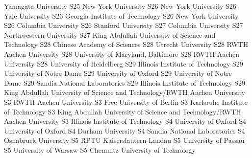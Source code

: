 \begin{multicols}{2}
{Yamagata University}
{S25}
{}
{New York University}
{S26}
{}
{New York University}
{S26}
{}
{Yale University}
{S26}
{}
{Georgia Institute of Technology}
{S26}
{}
{New York University}
{S26}
{}
{Columbia University}
{S26}
{}
{Stanford University}
{S27}
{}
{Columbia University}
{S27}
{}
{Northwestern University}
{S27}
{}
{King Abdullah University of Science and Technology}
{S28}
{}
{Chinese Academy of Sciences}
{S28}
{}
{Utrecht University}
{S28}
{}
{RWTH Aachen University}
{S28}
{}
{University of Maryland, Baltimore}
{S28}
{}
{RWTH Aachen University}
{S28}
{}
{University of Heidelberg}
{S29}
{}
{Illinois Institute of Technology}
{S29}
{}
{University of Notre Dame}
{S29}
{}
{University of Oxford}
{S29}
{}
{University of Notre Dame}
{S29}
{}
{Sandia National Laboratories}
{S29}
{}
{Illinois Institute of Technology}
{S29}
{}
{King Abdullah University of Science and Technology/RWTH Aachen University}
{S3}
{}
{RWTH Aachen University}
{S3}
{}
{Free University of Berlin}
{S3}
{}
{Karlsruhe Institute of Technology}
{S3}
{}
{King Abdullah University of Science and Technology/RWTH Aachen University}
{S3}
{}
{Illinois Institute of Technology}
{S4}
{}
{University of Oxford}
{S4}
{}
{University of Oxford}
{S4}
{}
{Durham University}
{S4}
{}
{Sandia National Laboratories}
{S4}
{}
{Osnabruck University}
{S5}
{}
{RPTU Kaiserslautern-Landau}
{S5}
{}
{University of Passau}
{S5}
{}
{University of Warsaw}
{S5}
{}
{Chemnitz University of Technology}

\end{multicols}
